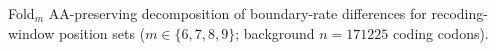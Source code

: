 Fold$_m$ AA-preserving decomposition of boundary-rate differences for recoding-window position sets ($m\in\{6,7,8,9\}$; background $n=171225$ coding codons).
